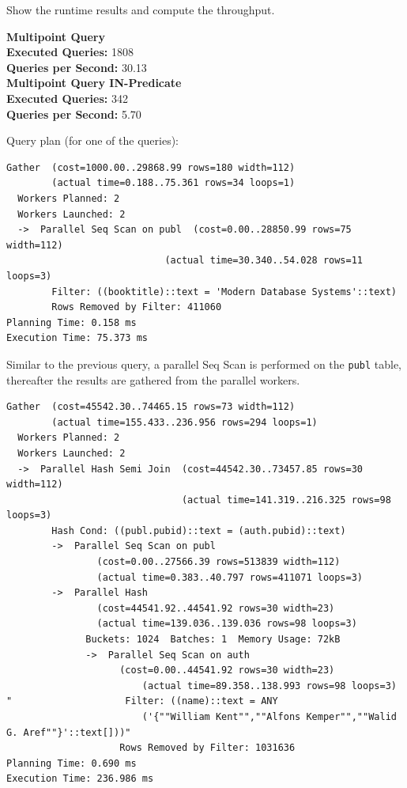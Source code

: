 \documentclass[11pt]{scrartcl}
\begin{document}
Show the runtime results and compute the throughput.

\textbf{Multipoint Query}\\
\textbf{Executed Queries: } 1808\\
\textbf{Queries per Second: } 30.13 \\

\textbf{Multipoint Query IN-Predicate}\\
\textbf{Executed Queries: } 342\\
\textbf{Queries per Second: } 5.70

Query plan (for one of the queries):

{\small
\parskip0pt\begin{verbatim}
Gather  (cost=1000.00..29868.99 rows=180 width=112)
        (actual time=0.188..75.361 rows=34 loops=1)
  Workers Planned: 2
  Workers Launched: 2
  ->  Parallel Seq Scan on publ  (cost=0.00..28850.99 rows=75 width=112)
                            (actual time=30.340..54.028 rows=11 loops=3)
        Filter: ((booktitle)::text = 'Modern Database Systems'::text)
        Rows Removed by Filter: 411060
Planning Time: 0.158 ms
Execution Time: 75.373 ms
\end{verbatim}}

Similar to the previous query, a parallel Seq Scan is performed on the \texttt{publ} table, thereafter the results are
gathered from the parallel workers.


{\small
\parskip0pt\begin{verbatim}
Gather  (cost=45542.30..74465.15 rows=73 width=112)
        (actual time=155.433..236.956 rows=294 loops=1)
  Workers Planned: 2
  Workers Launched: 2
  ->  Parallel Hash Semi Join  (cost=44542.30..73457.85 rows=30 width=112)
                               (actual time=141.319..216.325 rows=98 loops=3)
        Hash Cond: ((publ.pubid)::text = (auth.pubid)::text)
        ->  Parallel Seq Scan on publ
                (cost=0.00..27566.39 rows=513839 width=112)
                (actual time=0.383..40.797 rows=411071 loops=3)
        ->  Parallel Hash
                (cost=44541.92..44541.92 rows=30 width=23)
                (actual time=139.036..139.036 rows=98 loops=3)
              Buckets: 1024  Batches: 1  Memory Usage: 72kB
              ->  Parallel Seq Scan on auth
                    (cost=0.00..44541.92 rows=30 width=23)
                        (actual time=89.358..138.993 rows=98 loops=3)
"                    Filter: ((name)::text = ANY
                        ('{""William Kent"",""Alfons Kemper"",""Walid G. Aref""}'::text[]))"
                    Rows Removed by Filter: 1031636
Planning Time: 0.690 ms
Execution Time: 236.986 ms
\end{verbatim}}
\end{document}
